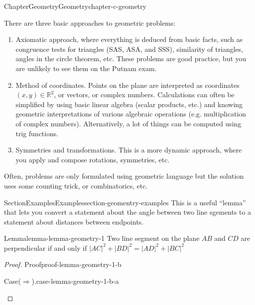 \documentclass[oneside,10pt,]{book}
\numberwithin{equation}{section}
\begin{document}
%
%
\typeout{************************************************}
\typeout{************************************************}
%
\begin{chapterptx}{Chapter}{Geometry}{}{Geometry}{}{}{chapter-c-geometry}
\renewcommand*{\chaptername}{Chapter}
\begin{introduction}{}%
There are three basic approaches to geometric problems:%
\begin{enumerate}[label=(\arabic*)]
\item{}Axiomatic approach, where everything is deduced from basic facts, such as congruence tests for triangles (SAS, ASA, and SSS), similarity of triangles, angles in the circle theorem, etc. These problems are good practice, but you are unlikely to see them on the Putnam exam.%
\item{}Method of coordinates. Points on the plane are interpreted as coordinates \((x,y) \in \mathbb{R}^2\), or vectors, or complex numbers. Calculations can often be simplified by using basic linear algebra (scalar products, etc.) and knowing geometric interpretations of various algebraic operations (e.g. multiplication of complex numbers). Alternatively, a lot of things can be computed using trig functions.%
\item{}Symmetries and transformations. This is a more dynamic approach, where you apply and compose rotations, symmetries, etc.%
\end{enumerate}
Often, problems are only formulated using geometric language but the solution uses some counting trick, or combinatorics, etc.%
\end{introduction}%
%
%
\typeout{************************************************}
\typeout{************************************************}
%
\begin{sectionptx}{Section}{Examples}{}{Examples}{}{}{section-geomentry-examples}
This is a useful ``lemma'' that lets you convert a statement about the angle between two line sgements to a statement about distances between endpoints.%
\begin{lemma}{Lemma}{}{}{lemma-lemma-geometry-1}%
Two line segment on the plane \(AB\) and \(CD\) are perpendicular if and only if \(\lvert AC \rvert^2 +  \lvert BD \rvert^2 = \lvert AD \rvert^2 + \lvert BC \rvert^2\)%
\end{lemma}
\begin{proof}{Proof}{}{proof-lemma-geometry-1-b}
\begin{case}{Case}{}{(\(\Rightarrow\)).}{case-lemma-geometry-1-b-a}

\end{case}
\end{proof}
\end{sectionptx}
\end{chapterptx}
\end{document}
